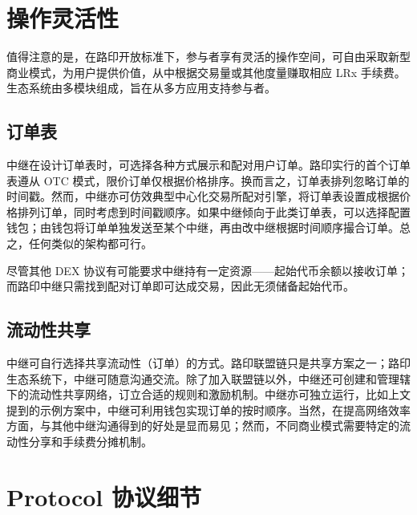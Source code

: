 \documentclass[UTF8,nofonts]{ctexart}%
\makeatletter
\newenvironment{figurehere}
 {\def\@captype{figure}}
 {}
\makeatother
\begin{document}
\begin{multicols}{2}
\begin{enumerate}
\end{enumerate}





%
%
%

\section{操作灵活性\label{sec:business_model}}
值得注意的是，在路印开放标准下，参与者享有灵活的操作空间，可自由采取新型商业模式，为用户提供价值，从中根据交易量或其他度量赚取相应 LRx 手续费。生态系统由多模块组成，旨在从多方应用支持参与者。


\subsection{订单表\label{sec:order_book}}
中继在设计订单表时，可选择各种方式展示和配对用户订单。路印实行的首个订单表遵从 OTC 模式，限价订单仅根据价格排序。换而言之，订单表排列忽略订单的时间戳。然而，中继亦可仿效典型中心化交易所配对引擎，将订单表设置成根据价格排列订单，同时考虑到时间戳顺序。如果中继倾向于此类订单表，可以选择配置钱包；由钱包将订单单独发送至某个中继，再由改中继根据时间顺序撮合订单。总之，任何类似的架构都可行。


尽管其他 DEX 协议有可能要求中继持有一定资源——起始代币余额以接收订单；而路印中继只需找到配对订单即可达成交易，因此无须储备起始代币。

\subsection{流动性共享\label{sec:liquidity_sharing}}
中继可自行选择共享流动性（订单）的方式。路印联盟链只是共享方案之一；路印生态系统下，中继可随意沟通交流。除了加入联盟链以外，中继还可创建和管理辖下的流动性共享网络，订立合适的规则和激励机制。中继亦可独立运行，比如上文提到的示例方案中，中继可利用钱包实现订单的按时顺序。当然，在提高网络效率方面，与其他中继沟通得到的好处是显而易见；然而，不同商业模式需要特定的流动性分享和手续费分摊机制。


\section{Protocol 协议细节\label{sec:protocol}}


\end{multicols}
\end{document}
